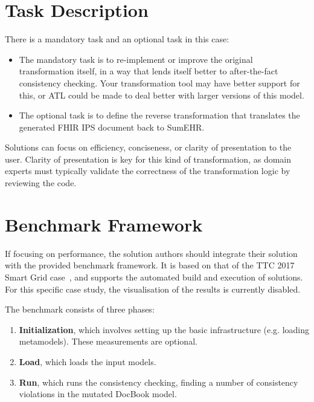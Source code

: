 \documentclass[
twocolumn,
]{ceurart}
\begin{document}
\section{Task Description}
\label{sec:task-description}

There is a mandatory task and an optional task in this case:

\begin{itemize}
\item The mandatory task is to re-implement or improve the original
  transformation itself, in a way that lends itself better to after-the-fact
  consistency checking. Your transformation tool may have better support for
  this, or ATL could be made to deal better with larger versions of this model.

\item The optional task is to define the reverse transformation that translates
  the generated FHIR IPS document back to SumEHR.
\end{itemize}

Solutions can focus on efficiency, conciseness, or clarity of presentation to
the user. Clarity of presentation is key for this kind of transformation, as
domain experts must typically validate the correctness of the transformation
logic by reviewing the code.

\section{Benchmark Framework}
\label{sec:benchmark-framework}

If focusing on performance, the solution authors should integrate their solution
with the provided benchmark framework. It is based on that of the TTC 2017 Smart
Grid case~\cite{hinkel_ttc_2017}, and supports the automated build and execution
of solutions. For this specific case study, the visualisation of the results is
currently disabled.

The benchmark consists of three phases:

\begin{enumerate}
\item \textbf{Initialization}, which involves setting up the basic
  infrastructure (e.g. loading metamodels). These measurements are optional.
\item \textbf{Load}, which loads the input models.
\item \textbf{Run}, which runs the consistency checking, finding a number of
  consistency violations in the mutated DocBook model.
\end{enumerate}
\end{document}
